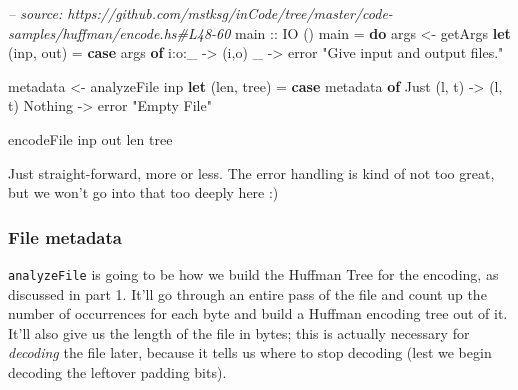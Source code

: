 \documentclass[]{article}
\newenvironment{Shaded}{\begin{snugshade}}{\end{snugshade}}
\newcommand{\CommentTok}[1]{\textcolor[rgb]{0.56,0.35,0.01}{\textit{#1}}}
\newcommand{\DataTypeTok}[1]{\textcolor[rgb]{0.13,0.29,0.53}{#1}}
\newcommand{\FunctionTok}[1]{\textcolor[rgb]{0.00,0.00,0.00}{#1}}
\newcommand{\KeywordTok}[1]{\textcolor[rgb]{0.13,0.29,0.53}{\textbf{#1}}}
\newcommand{\NormalTok}[1]{#1}
\newcommand{\OtherTok}[1]{\textcolor[rgb]{0.56,0.35,0.01}{#1}}
\newcommand{\StringTok}[1]{\textcolor[rgb]{0.31,0.60,0.02}{#1}}
\begin{document}
\begin{Shaded}
\begin{Highlighting}[]
\CommentTok{-- source: https://github.com/mstksg/inCode/tree/master/code-samples/huffman/encode.hs#L48-60}
\OtherTok{main ::} \DataTypeTok{IO}\NormalTok{ ()}
\NormalTok{main }\FunctionTok{=} \KeywordTok{do}
\NormalTok{    args     }\OtherTok{<-}\NormalTok{ getArgs}
    \KeywordTok{let}\NormalTok{ (inp, out)  }\FunctionTok{=} \KeywordTok{case}\NormalTok{ args }\KeywordTok{of}
\NormalTok{                        i}\FunctionTok{:}\NormalTok{o}\FunctionTok{:}\NormalTok{_      }\OtherTok{->}\NormalTok{ (i,o)}
\NormalTok{                        _          }\OtherTok{->}\NormalTok{ error }\StringTok{"Give input and output files."}

\NormalTok{    metadata }\OtherTok{<-}\NormalTok{ analyzeFile inp}
    \KeywordTok{let}\NormalTok{ (len, tree) }\FunctionTok{=} \KeywordTok{case}\NormalTok{ metadata }\KeywordTok{of}
                        \DataTypeTok{Just}\NormalTok{ (l, t) }\OtherTok{->}\NormalTok{ (l, t)}
                        \DataTypeTok{Nothing}     \OtherTok{->}\NormalTok{ error }\StringTok{"Empty File"}

\NormalTok{    encodeFile inp out len tree}
\end{Highlighting}
\end{Shaded}

Just straight-forward, more or less. The error handling is kind of not too
great, but we won't go into that too deeply here :)

\hypertarget{file-metadata}{%
\subsubsection{File metadata}\label{file-metadata}}

\texttt{analyzeFile} is going to be how we build the Huffman Tree for the
encoding, as discussed in part 1. It'll go through an entire pass of the file
and count up the number of occurrences for each byte and build a Huffman
encoding tree out of it. It'll also give us the length of the file in bytes;
this is actually necessary for \emph{decoding} the file later, because it tells
us where to stop decoding (lest we begin decoding the leftover padding bits).
\end{document}
